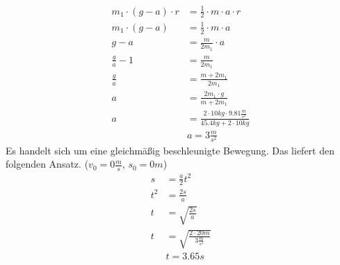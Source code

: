 \documentclass{article}
\begin{document}
	\begin{align*}
		m_1\cdot(g-a)\cdot r&=\frac{1}{2}\cdot m\cdot a\cdot r\\
		m_1\cdot(g-a)&=\frac{1}{2}\cdot m\cdot a\\
		g-a&=\frac{m}{2m_1}\cdot a\\
		\frac{g}{a}-1&=\frac{m}{2m_1}\\
		\frac{g}{a}&=\frac{m+2m_1}{2m_1}\\
		a&=\frac{2m_1\cdot g}{m+2m_1}\\
		a&=\frac{2\cdot10kg\cdot9.81\frac{m}{s^2}}{45.4kg+2\cdot10kg}\\
		&\boxed{a=3\frac{m}{s^2}}	\tag{a}	\label{eq:212_a}
	\end{align*}
	Es handelt sich um eine gleichmäßig beschleunigte Bewegung. Das liefert den folgenden Ansatz. ($v_0=0\frac{m}{s}$, $s_0=0m$)
	\begin{align*}
		s&=\frac{a}{2}t^2\\
		t^2&=\frac{2s}{a}\\
		t&=\sqrt{\frac{2s}{a}}\\
		t&=\sqrt{\frac{2\cdot20m}{3\frac{m}{s^2}}}\\
		&\boxed{t=3.65s}	\tag{b}	\label{eq:212_b}
	\end{align*}
	\newpage
	
\end{document}
